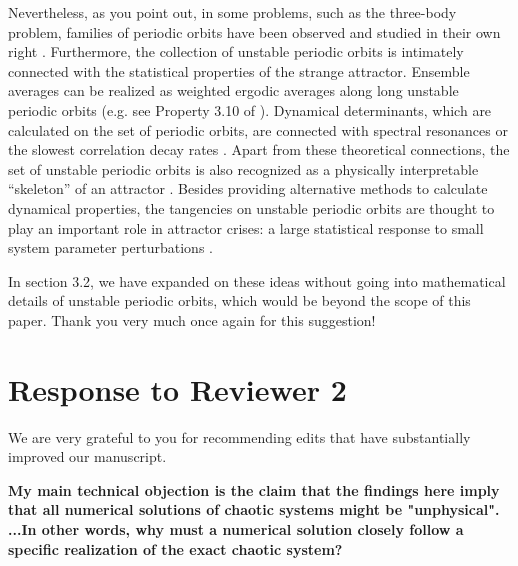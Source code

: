 \documentclass[11pt]{article}
\newcommand{\reviewerTwo}[1]{{\color{azure}\textbf{#1}}}
\begin{document}
Nevertheless, as you point out, in some problems, such as the three-body problem, families of periodic orbits have been observed and studied in their own right \cite{henon3body}. Furthermore, the collection of unstable periodic orbits is intimately connected with the statistical properties of the strange attractor. Ensemble averages can be realized as weighted ergodic averages along long unstable periodic orbits (e.g. see Property 3.10 of \cite{llave}). Dynamical determinants, which are calculated on the set of periodic orbits, are connected with spectral resonances or the slowest correlation decay rates \cite{baladi-book}. Apart from these theoretical connections, the set of unstable periodic orbits is also recognized as a physically interpretable ``skeleton'' of an attractor \cite{cvitanovic1}. Besides providing alternative methods to calculate dynamical properties, the tangencies on unstable periodic orbits are thought to play an important role in attractor crises: a large statistical response to small system parameter perturbations \cite{berry}\cite{grebogi1}.

In section 3.2, we have expanded on these ideas without going into mathematical details of unstable periodic orbits, which would be beyond the scope of this paper. Thank you very much once again for this suggestion! 

\section*{Response to Reviewer 2}
We are very grateful to you for recommending edits that have substantially improved our manuscript.

\reviewerTwo{My main technical objection is the claim that the findings here imply that all numerical solutions of chaotic systems might be "unphysical". ...In other words, why must a numerical solution closely follow a specific realization of the exact chaotic system? }
\end{document}
